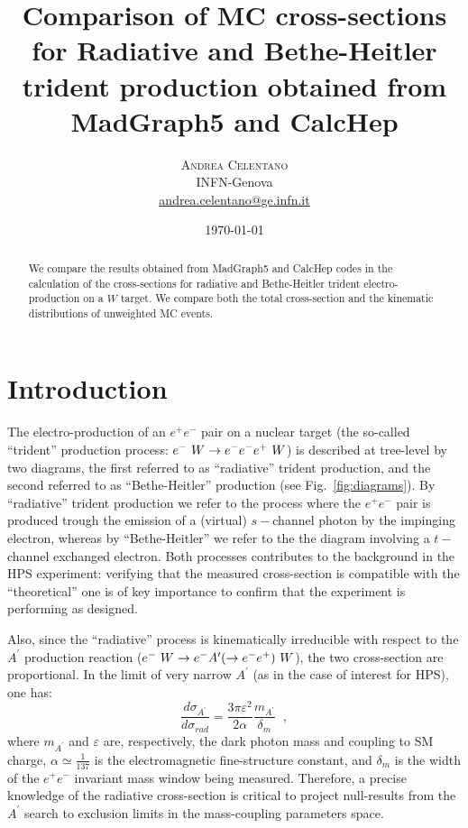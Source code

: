 \documentclass{article}
\title{\vspace{-15mm}\fontsize{24pt}{10pt}\selectfont\textbf{Comparison of MC cross-sections for Radiative and Bethe-Heitler  trident production obtained from MadGraph5 and CalcHep}} %
\author{
\large
\textsc{Andrea Celentano}\\ %
\normalsize INFN-Genova\\ %
\normalsize \href{mailto:andrea.celentano@ge.infn.it}{andrea.celentano@ge.infn.it} %
\vspace{0mm}
}
\date{\today}
\begin{document}
\maketitle %

\thispagestyle{fancy} %


\begin{abstract}
We compare the results obtained from MadGraph5 and CalcHep codes in the calculation of the cross-sections for radiative and Bethe-Heitler trident electro-production on a $W$ target.
We compare both the total cross-section and the kinematic distributions of unweighted MC events.
\noindent %
\end{abstract}
\section{Introduction}

The electro-production of an $e^+ e^-$ pair on a nuclear target (the so-called ``trident'' production process: $e^-~W\to e^-e^-e^+~W$) is described at tree-level by two diagrams, the first referred to as ``radiative'' trident production, and the second referred to as ``Bethe-Heitler'' production (see Fig.~\ref{fig:diagrams}). By ``radiative'' trident production we refer to the process where the $e^+ e^-$ pair is produced trough the emission of a (virtual) $s-$channel photon by the impinging electron, whereas by ``Bethe-Heitler'' we refer to the the diagram involving a $t-$channel exchanged electron. Both processes contributes to the background in the HPS experiment: verifying that the measured cross-section is compatible with the ``theoretical'' one is of key importance to confirm that the experiment is performing as designed.

 Also, since the ``radiative'' process is kinematically irreducible with respect to the $A^\prime$ production reaction ($e^-~W\to e^-A^\prime(\to e^-e^+)~W$), the two cross-section are proportional. In the limit of very narrow $A^\prime$ (as in the case of interest for HPS), one has:
\begin{equation}
\frac{d\sigma_{A^\prime}}{d\sigma_{rad}} = \frac{3\pi \varepsilon^2}{2\alpha}\frac{m_{A^\prime}}{\delta_m} \; \; ,
\end{equation}
where $m_{A^\prime}$ and $\varepsilon$ are, respectively, the dark photon mass and coupling to SM charge, $\alpha \simeq \frac{1}{137}$ is the electromagnetic fine-structure constant, and $\delta_m$ is the width of the $e^+ e^-$ invariant mass window being measured. Therefore, a precise knowledge of the radiative cross-section is critical to project null-results from the $A^\prime$ search to exclusion limits in the mass-coupling parameters space.
\end{document}
